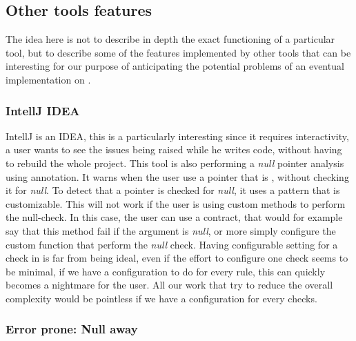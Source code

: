 \subsection{Other tools features}
\label{subsec:other_tools_features}

The idea here is not to describe in depth the exact functioning of a particular tool, but to describe some of the features implemented by other tools that can be interesting for our purpose of anticipating the potential problems of an eventual implementation on \slang{}.

\subsubsection{IntellJ IDEA}
\label{subsubsec:intellj_idea}

IntellJ is an IDEA, this is a particularly interesting since it requires interactivity, a user wants to see the issues being raised while he writes code, without having to rebuild the whole project. 
This tool is also performing a \emph{null} pointer analysis using annotation. 
It warns when the user use a pointer that is \nullable{}, without checking it for \emph{null}. 
To detect that a pointer is checked for \emph{null}, it uses a pattern that is customizable. 
This will not work if the user is using custom methods to perform the null-check. 
In this case, the user can use a contract, that would for example say that this method fail if the argument is \emph{null}, or more simply configure the custom function that perform the \emph{null} check.\newline
Having configurable setting for a check in \slang{} is far from being ideal, even if the effort to configure one check seems to be minimal, if we have a configuration to do for every rule, this can quickly becomes a nightmare for the user. 
All our work that try to reduce the overall complexity would be pointless if we have a configuration for every checks.


\subsubsection{Error prone: Null away}
\label{subsubsec:error_prone}

